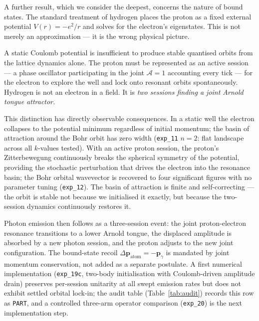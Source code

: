 \medskip

A further result, which we consider the deepest, concerns the nature of
bound states.
The standard treatment of hydrogen places the proton as a fixed external
potential $V(r) = -e^2/r$ and solves for the electron's eigenstates.
This is not merely an approximation --- it is the wrong physical picture.

A static Coulomb potential is insufficient to produce stable quantised
orbits from the lattice dynamics alone.
The proton must be represented as an active session --- a phase oscillator
participating in the joint $\mathcal{A}=1$ accounting every tick ---
for the electron to explore the well and lock onto resonant orbits
spontaneously.
Hydrogen is not an electron in a field.
It is \emph{two sessions finding a joint Arnold tongue attractor.}

This distinction has directly observable consequences.
In a static well the electron collapses to the potential minimum regardless
of initial momentum; the basin of attraction around the Bohr orbit has
zero width (\texttt{exp\_11} $n=2$: flat landscape across all
$k$-values tested).
With an active proton session, the proton's Zitterbewegung continuously
breaks the spherical symmetry of the potential, providing the stochastic
perturbation that drives the electron into the resonance basin;
the Bohr orbital wavevector is recovered to four significant figures
with no parameter tuning (\texttt{exp\_12}).
The basin of attraction is finite and self-correcting --- the orbit is
stable not because we initialised it exactly, but because the two-session
dynamics continuously restores it.

Photon emission then follows as a three-session event: the joint
proton-electron resonance transitions to a lower Arnold tongue, the
displaced amplitude is absorbed by a new photon session, and the proton
adjusts to the new joint configuration.
The bound-state recoil
$\Delta\mathbf{p}_\text{atom} = -\mathbf{p}_\gamma$ is mandated by
joint momentum conservation, not added as a separate postulate.
A first numerical implementation
(\texttt{exp\_19c}, two-body initialisation with Coulomb-driven
amplitude drain) preserves per-session unitarity at all swept emission
rates but does not exhibit settled orbital lock-in; the audit table
(Table~\ref{tab:audit}) records this row as \texttt{PART}, and a
controlled three-arm operator comparison (\texttt{exp\_20}) is the
next implementation step.


